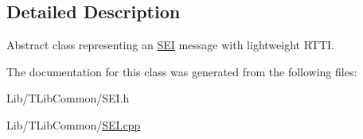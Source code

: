\subsection{Detailed Description}
Abstract class representing an \hyperlink{class_s_e_i}{S\+EI} message with lightweight R\+T\+TI. 

The documentation for this class was generated from the following files\+:\begin{DoxyCompactItemize}
\item 
Lib/\+T\+Lib\+Common/S\+E\+I.\+h\item 
Lib/\+T\+Lib\+Common/\hyperlink{_s_e_i_8cpp}{S\+E\+I.\+cpp}\end{DoxyCompactItemize}
